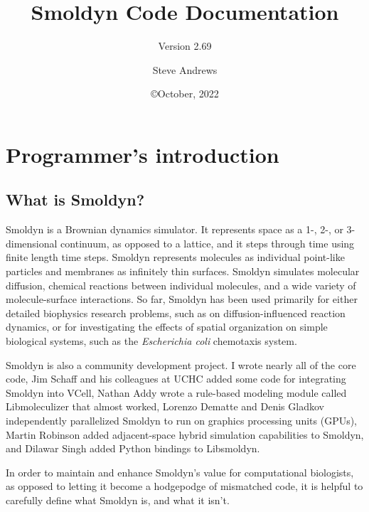 \documentclass {scrbook}
\begin{document}

\title{Smoldyn Code Documentation} 
\subtitle{Version 2.69}
\date{\copyright October, 2022}
\author{Steve Andrews}
\maketitle

\tableofcontents


\chapter{Programmer's introduction}

\section{What is Smoldyn?}

Smoldyn is a Brownian dynamics simulator. It represents space as a 1-, 2-, or 3-dimensional continuum, as opposed to a lattice, and it steps through time using finite length time steps. Smoldyn represents molecules as individual point-like particles and membranes as infinitely thin surfaces. Smoldyn simulates molecular diffusion, chemical reactions between individual molecules, and a wide variety of molecule-surface interactions. So far, Smoldyn has been used primarily for either detailed biophysics research problems, such as on diffusion-influenced reaction dynamics, or for investigating the effects of spatial organization on simple biological systems, such as the \emph{Escherichia coli} chemotaxis system.

Smoldyn is also a community development project. I wrote nearly all of the core code, Jim Schaff and his colleagues at UCHC added some code for integrating Smoldyn into VCell, Nathan Addy wrote a rule-based modeling module called Libmoleculizer that almost worked, Lorenzo Dematte and Denis Gladkov independently parallelized Smoldyn to run on graphics processing units (GPUs), Martin Robinson added adjacent-space hybrid simulation capabilities to Smoldyn, and Dilawar Singh added Python bindings to Libsmoldyn.

In order to maintain and enhance Smoldyn's value for computational biologists, as opposed to letting it become a hodgepodge of mismatched code, it is helpful to carefully define what Smoldyn is, and what it isn't.
\end{document}
